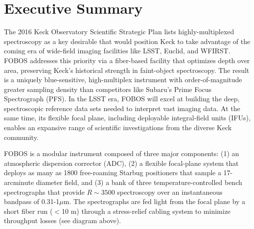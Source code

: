 
\vspace{-0.5cm}
\section{Executive Summary}


The 2016 Keck Observatory Scientific Strategic Plan lists
highly-multiplexed spectroscopy as a key desirable that would
position Keck to take advantage of the coming era of wide-field
imaging facilities like LSST, Euclid, and WFIRST. FOBOS addresses
this priority via a fiber-based facility that optimizes depth over
area, preserving Keck's historical strength in faint-object
spectroscopy. The result is a uniquely blue-sensitive, high-multiplex
instrument with order-of-magnitude greater sampling density than
competitors like Subaru's Prime Focus Spectrograph (PFS). In the LSST
era, FOBOS will excel at building the deep, spectroscopic reference
data sets needed to interpret vast imaging data. At the same time,
its flexible focal plane, including deployable integral-field units
(IFUs), enables an expansive range of scientific investigations from
the diverse Keck community.

FOBOS is a modular instrument composed of three major components: (1)
an atmospheric dispersion corrector (ADC), (2) a flexible focal-plane system
that deploys as many as 1800 free-roaming Starbug positioners that sample a 17-arcminute diameter field, and
(3) a bank of three temperature-controlled bench spectrographs
 that provide $R \sim 3500$
spectroscopy over an instantaneous bandpass of 0.31-1$\mu$m. The
spectrographs are fed light from the focal plane by a short fiber run
($<$10 m) through a stress-relief cabling system to minimize
throughput losses (see diagram above).


